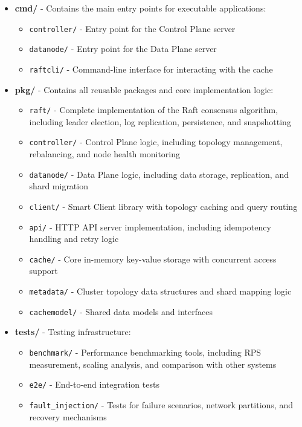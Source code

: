 \documentclass[shortabstract]{iithesis}
\begin{document}
\begin{itemize}
    \item \textbf{cmd/} - Contains the main entry points for executable applications:
    \begin{itemize}
        \item \texttt{controller/} - Entry point for the Control Plane server
        \item \texttt{datanode/} - Entry point for the Data Plane server
        \item \texttt{raftcli/} - Command-line interface for interacting with the cache
    \end{itemize}
    
    \item \textbf{pkg/} - Contains all reusable packages and core implementation logic:
    \begin{itemize}
        \item \texttt{raft/} - Complete implementation of the Raft consensus algorithm, including leader election, log replication, persistence, and snapshotting
        \item \texttt{controller/} - Control Plane logic, including topology management, rebalancing, and node health monitoring
        \item \texttt{datanode/} - Data Plane logic, including data storage, replication, and shard migration
        \item \texttt{client/} - Smart Client library with topology caching and query routing
        \item \texttt{api/} - HTTP API server implementation, including idempotency handling and retry logic
        \item \texttt{cache/} - Core in-memory key-value storage with concurrent access support
        \item \texttt{metadata/} - Cluster topology data structures and shard mapping logic
        \item \texttt{cachemodel/} - Shared data models and interfaces
    \end{itemize}
    
    \item \textbf{tests/} - Testing infrastructure:
    \begin{itemize}
        \item \texttt{benchmark/} - Performance benchmarking tools, including RPS measurement, scaling analysis, and comparison with other systems
        \item \texttt{e2e/} - End-to-end integration tests
        \item \texttt{fault\_injection/} - Tests for failure scenarios, network partitions, and recovery mechanisms
    \end{itemize}
    

\end{itemize}
\end{document}
